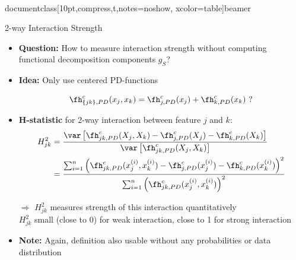 \\documentclass[10pt,compress,t,notes=noshow, xcolor=table]{beamer}
\begin{document}
\begin{frame}{2-way Interaction Strength}
\begin{itemize}[<+->]
    \item \textbf{Question:} How to measure interaction strength without computing functional decomposition components $g_S$?
    \item \textbf{Idea:} Only use centered PD-functions

    $$
    \fh_{\{jk\}, PD}^c(x_j, x_k)
            = \fh^c_{j, PD}(x_j) + \fh^c_{k, PD}(x_k) \text{ ?}
    $$
    
    \item \textbf{H-statistic} for 2-way interaction between feature $j$ and $k$:
    \begin{align*}
    H^2_{jk}
    & = \frac{
        \var \left[ \fh^c_{jk,PD}(X_j, X_k) - \fh^c_{j, PD}(X_j) - \fh^c_{k, PD}(X_k) \right]
    }{ \var \left[ \fh^c_{jk,PD}(X_j, X_k) \right] } \\
    & = \frac{
        \sum_{i=1}^n \left( \fh^c_{jk,PD}(x_j^{(i)}, x_k^{(i)})
        - \fh^c_{j, PD}(x_j^{(i)}) - \fh^c_{k, PD}(x_k^{(i)}) \right)^2
    }{
        \sum_{i=1}^n \left( \fh^c_{jk,PD}(x_j^{(i)}, x_k^{(i)}) \right)^2
    }
    \end{align*}
    \item[$\Rightarrow$]
    $H^2_{jk}$ measures strength of this interaction quantitatively \\
    $H^2_{jk}$ small (close to 0) for weak interaction, close to 1 for strong interaction
    \item \textbf{Note:} Again, definition also usable without any probabilities or data distribution
\end{itemize}




\end{frame}
\end{document}
